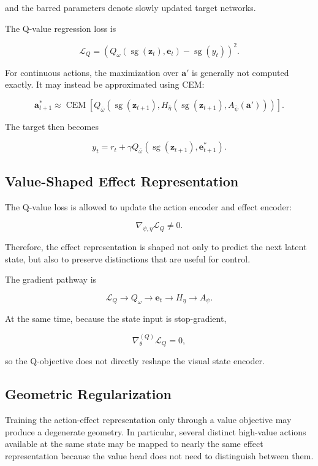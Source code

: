 ﻿\documentclass{article}
\begin{document}
and the barred parameters denote slowly updated target networks.

The Q-value regression loss is

\[
\mathcal{L}_{Q}
=
\left(
Q_{\omega}
\left(
\operatorname{sg}(\mathbf{z}_t),
\mathbf{e}_t
\right)
-
\operatorname{sg}(y_t)
\right)^2.
\]

For continuous actions, the maximization over \(\mathbf{a}'\) is generally
not computed exactly. It may instead be approximated using CEM:

\[
\mathbf{a}_{t+1}^{*}
\approx
\operatorname{CEM}
\left[
Q_{\bar{\omega}}
\left(
\operatorname{sg}(\mathbf{z}_{t+1}),
H_{\bar{\eta}}
\left(
\operatorname{sg}(\mathbf{z}_{t+1}),
A_{\bar{\psi}}(\mathbf{a}')
\right)
\right)
\right].
\]

The target then becomes

\[
y_t
=
r_t
+
\gamma
Q_{\bar{\omega}}
\left(
\operatorname{sg}(\mathbf{z}_{t+1}),
\mathbf{e}_{t+1}^{*}
\right).
\]

\subsection{Value-Shaped Effect Representation}

The Q-value loss is allowed to update the action encoder and effect
encoder:

\[
\nabla_{\psi,\eta}\mathcal{L}_{Q}
\neq
0.
\]

Therefore, the effect representation is shaped not only to predict the
next latent state, but also to preserve distinctions that are useful for
control.

The gradient pathway is

\[
\mathcal{L}_{Q}
\longrightarrow
Q_{\omega}
\longrightarrow
\mathbf{e}_t
\longrightarrow
H_{\eta}
\longrightarrow
A_{\psi}.
\]

At the same time, because the state input is stop-gradient,

\[
\nabla_{\theta}^{(Q)} \mathcal{L}_{Q}
=
0,
\]

so the Q-objective does not directly reshape the visual state encoder.

\subsection{Geometric Regularization}

Training the action-effect representation only through a value objective
may produce a degenerate geometry. In particular, several distinct
high-value actions available at the same state may be mapped to nearly
the same effect representation because the value head does not need to
distinguish between them.
\end{document}

